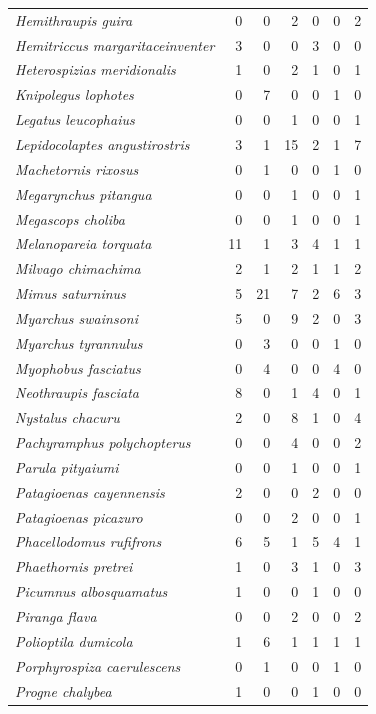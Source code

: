 \documentclass[12pt, A4]{article}
\begin{document}
\begin{longtable}{>{\itshape}lrrrrrr}
    Hemithraupis guira & 0 & 0 & 2 & 0 & 0 & 2 \\ 
    Hemitriccus margaritaceinventer & 3 & 0 & 0 & 3 & 0 & 0 \\ 
    Heterospizias meridionalis & 1 & 0 & 2 & 1 & 0 & 1 \\ 
    Knipolegus lophotes & 0 & 7 & 0 & 0 & 1 & 0 \\ 
    Legatus leucophaius & 0 & 0 & 1 & 0 & 0 & 1 \\ 
    Lepidocolaptes angustirostris & 3 & 1 & 15 & 2 & 1 & 7 \\ 
    Machetornis rixosus & 0 & 1 & 0 & 0 & 1 & 0 \\ 
    Megarynchus pitangua & 0 & 0 & 1 & 0 & 0 & 1 \\ 
    Megascops choliba & 0 & 0 & 1 & 0 & 0 & 1 \\ 
    Melanopareia torquata & 11 & 1 & 3 & 4 & 1 & 1 \\ 
    Milvago chimachima & 2 & 1 & 2 & 1 & 1 & 2 \\ 
    Mimus saturninus & 5 & 21 & 7 & 2 & 6 & 3 \\ 
    Myarchus swainsoni & 5 & 0 & 9 & 2 & 0 & 3 \\ 
    Myarchus tyrannulus & 0 & 3 & 0 & 0 & 1 & 0 \\ 
    Myophobus fasciatus & 0 & 4 & 0 & 0 & 4 & 0 \\ 
    Neothraupis fasciata & 8 & 0 & 1 & 4 & 0 & 1 \\ 
    Nystalus chacuru & 2 & 0 & 8 & 1 & 0 & 4 \\ 
    Pachyramphus polychopterus & 0 & 0 & 4 & 0 & 0 & 2 \\ 
    Parula pityaiumi & 0 & 0 & 1 & 0 & 0 & 1 \\ 
    Patagioenas cayennensis & 2 & 0 & 0 & 2 & 0 & 0 \\ 
    Patagioenas picazuro & 0 & 0 & 2 & 0 & 0 & 1 \\ 
    Phacellodomus rufifrons & 6 & 5 & 1 & 5 & 4 & 1 \\ 
    Phaethornis pretrei & 1 & 0 & 3 & 1 & 0 & 3 \\ 
    Picumnus albosquamatus & 1 & 0 & 0 & 1 & 0 & 0 \\ 
    Piranga flava & 0 & 0 & 2 & 0 & 0 & 2 \\ 
    Polioptila dumicola & 1 & 6 & 1 & 1 & 1 & 1 \\ 
    Porphyrospiza caerulescens & 0 & 1 & 0 & 0 & 1 & 0 \\ 
    Progne chalybea & 1 & 0 & 0 & 1 & 0 & 0 \\ 

\end{longtable}
\end{document}
